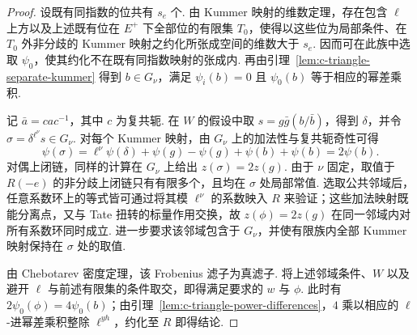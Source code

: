 \begin{proof}
设既有同指数的位共有 $s_e$ 个. 由 Kummer 映射的维数定理，存在包含 $\ell$ 上方以及上述既有位在 $E^+$ 下全部位的有限集 $T_0$，使得以这些位为局部条件、在 $T_0$ 外非分歧的 Kummer 映射之约化所张成空间的维数大于 $s_e$. 因而可在此族中选取 $\psi_0$，使其约化不在既有同指数映射的张成内. 再由引理~\ref{lem:c-triangle-separate-kummer} 得到 $b\in G_\nu$，满足 $\psi_i(b)=0$ 且 $\psi_0(b)$ 等于相应的幂差乘积.

记 $\bar a=cac^{-1}$，其中 $c$ 为复共轭. 在 $W$ 的假设中取 $s=g\bar g(b/\bar b)$，得到 $\delta$，并令 $\sigma=\delta^{\ell^\nu}s\in G_\nu$. 对每个 Kummer 映射，由 $G_\nu$ 上的加法性与复共轭奇性可得
\[
 \psi(\sigma)=\ell^\nu\psi(\delta)+\psi(g)-\psi(g)
                  +\psi(b)+\psi(b)=2\psi(b).
\]
对偶上闭链，同样的计算在 $G_\nu$ 上给出 $z(\sigma)=2z(g)$. 由于 $\nu$ 固定，取值于 $R(-e)$ 的非分歧上闭链只有有限多个，且均在 $\sigma$ 处局部常值. 选取公共邻域后，任意系数环上的等式皆可通过将其模 $\ell^\nu$ 的系数映入 $R$ 来验证；这些加法映射既能分离点，又与 Tate 扭转的标量作用交换，故 $z(\phi)=2z(g)$ 在同一邻域内对所有系数环同时成立. 进一步要求该邻域包含于 $G_\nu$，并使有限族内全部 Kummer 映射保持在 $\sigma$ 处的取值.

由 Chebotarev 密度定理，该 Frobenius 滤子为真滤子. 将上述邻域条件、$W$ 以及避开 $\ell$ 与前述有限集的条件取交，即得满足要求的 $w$ 与 $\phi$. 此时有 $2\psi_0(\phi)=4\psi_0(b)$；由引理~\ref{lem:c-triangle-power-differences}，$4$ 乘以相应的 $\ell$-进幂差乘积整除 $\ell^{yh}$，约化至 $R$ 即得结论.
\end{proof}

